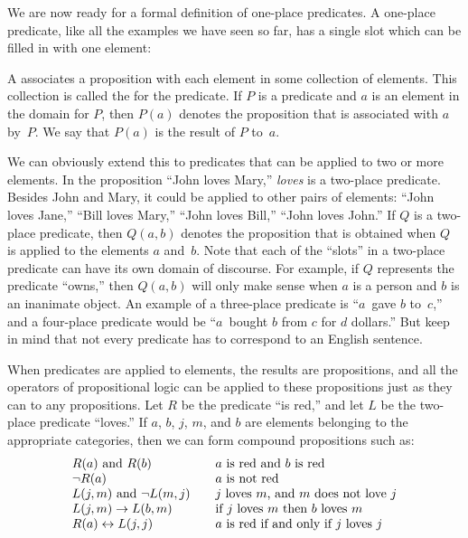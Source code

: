 We are now ready for a formal definition of one-place
predicates.  A one-place
predicate, like all the examples we have seen so far, has a single
slot which can be filled in with one element:


\begin{definition}
A  associates a proposition with each element in some
collection of elements.  This collection is called the  for the predicate.  If $P$ is a predicate and $a$ is
an element in the domain for $P$, then $P(a)$ denotes
the proposition that is associated with $a$ by~$P$.  We say that $P(a)$
is the result of  $P$ to~$a$.
\end{definition}

We can obviously extend this to predicates that can be applied to
two or more elements.  In the proposition ``John loves Mary,''
\emph{loves} is a two-place predicate.  Besides John and Mary,
it could be applied to other pairs of elements:  ``John loves Jane,''
``Bill loves Mary,'' ``John loves Bill,''  ``John loves John.''
If $Q$ is a two-place
predicate, then $Q(a,b)$ denotes the proposition that is obtained
when $Q$ is applied to the elements $a$ and~$b$.  Note that each of
the ``slots'' in a two-place predicate can have its own domain of
discourse.  For example, if $Q$ represents the predicate ``owns,''
then $Q(a,b)$ will only make sense when $a$ is a person and $b$ is an
inanimate object.  An example of a three-place predicate is
``$a$~gave $b$ to~$c$,'' and a four-place predicate would be
``$a$~bought $b$ from $c$ for $d$ dollars.''  But keep in mind that
not every predicate has to correspond to an English sentence.

When predicates are applied to elements, the results are propositions,
and all the operators of propositional logic can be applied to these
propositions just as they can to any propositions.  Let $R$ be the
predicate ``is red,'' and let $L$ be the two-place predicate ``loves.''
If $a$, $b$, $j$, $m$, and $b$ are elements belonging to the 
appropriate categories, then we can form compound propositions such
as:
\[
\begin{array}{l@{\qquad}l}
   R(a)\AND R(b)         &\text{$a$ is red and $b$ is red}\\
   \NOT R(a)             &\text{$a$ is not red}\\
   L(j,m)\AND\NOT L(m,j) &\text{$j$ loves $m$, and $m$ does not love $j$}\\
   L(j,m)\IMP L(b,m)     &\text{if $j$ loves $m$ then $b$ loves $m$}\\
   R(a)\IFF L(j,j)       &\text{$a$ is red if and only if $j$ loves $j$}\\
\end{array}
\]



